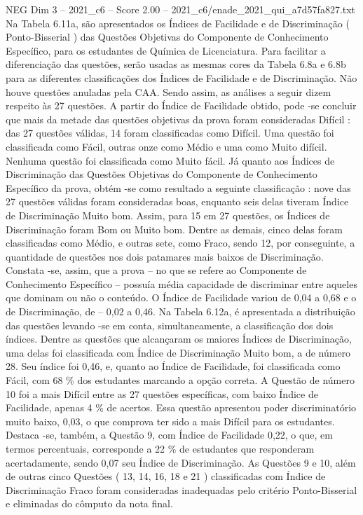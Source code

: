 \begin{textsample}{NEG Dim 3 – 2021\_c6 – Score 2.00 – 2021\_c6/enade\_2021\_qui\_a7d57fa827.txt}
Na Tabela 6.11a, são apresentados os Índices de Facilidade e de Discriminação ( Ponto-Bisserial ) das Questões Objetivas do Componente de Conhecimento Específico, para os estudantes de Química de Licenciatura.
Para facilitar a diferenciação das questões, serão usadas as mesmas cores da Tabela 6.8a e 6.8b para as diferentes classificações dos Índices de Facilidade e de Discriminação.
Não houve questões anuladas pela CAA.
Sendo assim, as análises a seguir dizem respeito às 27 questões.
A partir do Índice de Facilidade obtido, pode -se concluir que mais da metade das questões objetivas da prova foram consideradas Difícil : das 27 questões válidas, 14 foram classificadas como Difícil.
Uma questão foi classificada como Fácil, outras onze como Médio e uma como Muito difícil.
Nenhuma questão foi classificada como Muito fácil.
Já quanto aos Índices de Discriminação das Questões Objetivas do Componente de Conhecimento Específico da prova, obtém -se como resultado a seguinte classificação : nove das 27 questões válidas foram consideradas boas, enquanto seis delas tiveram Índice de Discriminação Muito bom.
Assim, para 15 em 27 questões, os Índices de Discriminação foram Bom ou Muito bom.
Dentre as demais, cinco delas foram classificadas como Médio, e outras sete, como Fraco, sendo 12, por conseguinte, a quantidade de questões nos dois patamares mais baixos de Discriminação.
Constata -se, assim, que a prova – no que se refere ao Componente de Conhecimento Específico – possuía média capacidade de discriminar entre aqueles que dominam ou não o conteúdo.
O Índice de Facilidade variou de 0,04 a 0,68 e o de Discriminação, de – 0,02 a 0,46.
Na Tabela 6.12a, é apresentada a distribuição das questões levando -se em conta, simultaneamente, a classificação dos dois índices.
Dentre as questões que alcançaram os maiores Índices de Discriminação, uma delas foi classificada com Índice de Discriminação Muito bom, a de número 28.
Seu índice foi 0,46, e, quanto ao Índice de Facilidade, foi classificada como Fácil, com 68 \% dos estudantes marcando a opção correta.
A Questão de número 10 foi a mais Difícil entre as 27 questões específicas, com baixo Índice de Facilidade, apenas 4 \% de acertos.
Essa questão apresentou poder discriminatório muito baixo, 0,03, o que comprova ter sido a mais Difícil para os estudantes.
Destaca -se, também, a Questão 9, com Índice de Facilidade 0,22, o que, em termos percentuais, corresponde a 22 \% de estudantes que responderam acertadamente, sendo 0,07 seu Índice de Discriminação.
As Questões 9 e 10, além de outras cinco Questões ( 13, 14, 16, 18 e 21 ) classificadas com Índice de Discriminação Fraco foram consideradas inadequadas pelo critério Ponto-Bisserial e eliminadas do cômputo da nota final.

\end{textsample}
